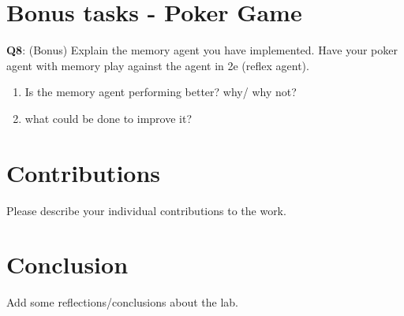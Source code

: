 \documentclass{article}
\begin{document}
\section*{Bonus tasks - Poker Game}

\begin{tcolorbox}
\textbf{Q8}: (Bonus) Explain the memory agent you have implemented. Have your poker agent with memory play against the agent in 2e (reflex agent).  
        
        \begin{enumerate}
            \item Is the memory agent performing better? why/ why not?
            \item what could be done to improve it?
        \end{enumerate}
\end{tcolorbox}

\section*{Contributions}

Please describe your individual contributions to the work.

\section*{Conclusion}

Add some reflections/conclusions about the lab.
\end{document}
